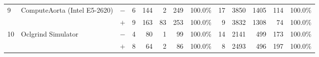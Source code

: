 \begin{tabular}{lll | rrrrr | rrrrr }
\hline
\multirow{ 2}{*}{9} & \multirow{ 2}{*}{ComputeAorta (Intel E5-2620)} & $-$ & 6 & 144 & 2 & 249 & 100.0\%       & 17 & 3850 & 1405 & 114 & 100.0\% \\& & $+$ & 9 & 163 & 83 & 253 & 100.0\% & 9 & 3832 & 1308 & 74 & 100.0\% \\
\hline
\multirow{ 2}{*}{10} & \multirow{ 2}{*}{Oclgrind Simulator} & $-$ & 4 & 80 & 1 & 99 & 100.0\%       & 14 & 2141 & 499 & 173 & 100.0\% \\& & $+$ & 8 & 64 & 2 & 86 & 100.0\% & 8 & 2493 & 496 & 197 & 100.0\% \\
  \bottomrule
\end{tabular}

